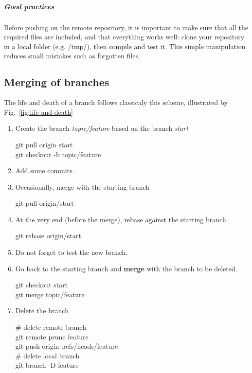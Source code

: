 \subparagraph{Good practices}
Before pushing on the remote repository, it is important to make sure that all the required files are included, and that everything works well: 
clone your repository in a local folder (e.g. /tmp/), then compile and test it.
This simple manipulation reduces small mistakes such as forgotten files.


\subsection{Merging of branches}

The life and death of a branch follows classicaly this scheme, illustrated by Fig.~\ref{fig:life-and-death}
\begin{enumerate}
\item Create the branch \textit{topic/feature} based on the branch \textit{start}\\
\begin{tt}
git pull origin start\\
git checkout -b topic/feature
\end{tt}

\item Add some commits.

\item  Occasionally, merge with the starting branch\\
\begin{tt}
git pull origin/start
\end{tt}

\item At the very end (before the merge), rebase against the starting branch \\
\begin{tt}
git rebase origin/start
\end{tt}

\item  Do not forget to test the new branch.\\

\item  Go back to the starting branch and \textbf{merge} with the branch to be deleted.\\
\begin{tt}
git checkout start\\
git merge topic/feature
\end{tt}

\item  Delete the branch\\
\begin{tt}
$\#$ delete remote branch\\
git remote prune feature\\
git push origin :refs/heads/feature\\
$\#$ delete local branch\\
git branch -D feature
\end{tt}
\end{enumerate}

